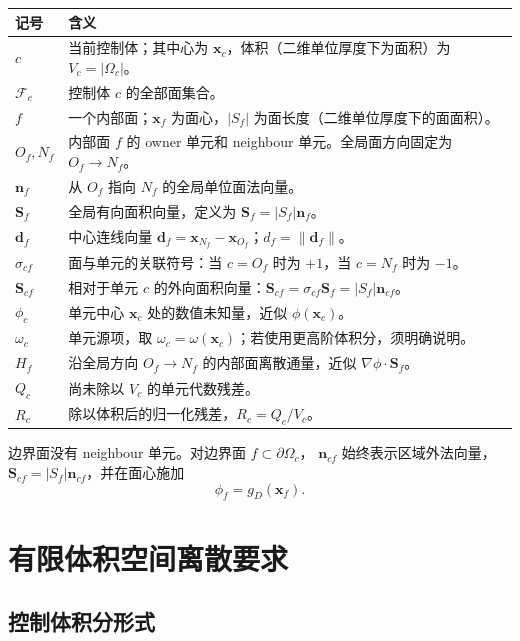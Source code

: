\documentclass[11pt,a4paper]{ctexart}
\newcommand{\F}{\mathcal{F}}
\begin{document}
\begin{longtable}{>{\centering\arraybackslash}p{}p{}}
\toprule
记号 & 含义\\
\midrule
$c$ & 当前控制体；其中心为 $\mathbf{x}_c$，体积（二维单位厚度下为面积）为 $V_c=|\Omega_c|$。\\
$\F_c$ & 控制体 $c$ 的全部面集合。\\
$f$ & 一个内部面；$\mathbf{x}_f$ 为面心，$|S_f|$ 为面长度（二维单位厚度下的面面积）。\\
$O_f,N_f$ & 内部面 $f$ 的 owner 单元和 neighbour 单元。全局面方向固定为 $O_f\to N_f$。\\
$\mathbf n_f$ & 从 $O_f$ 指向 $N_f$ 的全局单位面法向量。\\
$\mathbf S_f$ & 全局有向面积向量，定义为 $\mathbf S_f=|S_f|\mathbf n_f$。\\
$\mathbf d_f$ & 中心连线向量 $\mathbf d_f=\mathbf x_{N_f}-\mathbf x_{O_f}$；$d_f=\|\mathbf d_f\|$。\\
$\sigma_{cf}$ & 面与单元的关联符号：当 $c=O_f$ 时为 $+1$，当 $c=N_f$ 时为 $-1$。\\
$\mathbf S_{cf}$ & 相对于单元 $c$ 的外向面积向量：$\mathbf S_{cf}=\sigma_{cf}\mathbf S_f=|S_f|\mathbf n_{cf}$。\\
$\phi_c$ & 单元中心 $\mathbf x_c$ 处的数值未知量，近似 $\phi(\mathbf x_c)$。\\
$\omega_c$ & 单元源项，取 $\omega_c=\omega(\mathbf x_c)$；若使用更高阶体积分，须明确说明。\\
$H_f$ & 沿全局方向 $O_f\to N_f$ 的内部面离散通量，近似 $\nabla\phi\cdot\mathbf S_f$。\\
$Q_c$ & 尚未除以 $V_c$ 的单元代数残差。\\
$R_c$ & 除以体积后的归一化残差，$R_c=Q_c/V_c$。\\
\bottomrule
\end{longtable}

边界面没有 neighbour 单元。对边界面 $f\subset\partial\Omega_c$，
$\mathbf n_{cf}$ 始终表示区域外法向量，
$\mathbf S_{cf}=|S_f|\mathbf n_{cf}$，并在面心施加
\begin{equation}
  \phi_f=g_D(\mathbf x_f).
  \label{eq:boundary-face-value}
\end{equation}

\section{有限体积空间离散要求}

\subsection{控制体积分形式}
\end{document}
